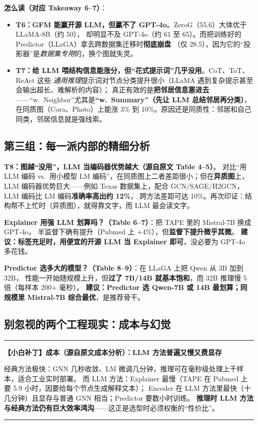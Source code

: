 \documentclass[11pt,UTF8,fontset=fandol]{ctexart}
\newenvironment{tip}[1]{%
  \par\smallskip\noindent\rule{\linewidth}{0.4pt}\par\nobreak
  \noindent\textbf{【小白补丁】#1}\par\nobreak\noindent\ignorespaces
}{%
  \par\noindent\rule{\linewidth}{0.4pt}\par\smallskip
}
\begin{document}
\textbf{怎么读（对应 Takeaway 6{--}7）}：
\begin{itemize}[leftmargin=2em]
  \item \textbf{T6：GFM 能赢开源 LLM，但赢不了 GPT-4o}。ZeroG（55.6）大体优于 LLaMA-8B（约 50），
        却明显不及 GPT-4o（约 61 至 65）。而把训练好的 Predictor（LLaGA）拿去跨数据集迁移时\textbf{彻底崩盘}
        （仅 28.5），因为它的“投影器”是\emph{数据集专用}的，换个图就失灵。
  \item \textbf{T7：给 LLM 喂结构信息能涨分，但“花式提示词”几乎没用}。CoT、ToT、ReAct 这些
        \emph{通用推理}提示词对节点分类提升很小（LLaMA 遇到复杂提示甚至会输出超长、难解析的内容）；
        真正有效的是\textbf{把邻居信息塞进去}——“w.\ Neighbor”尤其是\textbf{“w.\ Summary”（先让 LLM 总结邻居再分类）}，
        在同质图（Cora、Photo）上能涨 3\% 到 10\%。原因还是同质性：邻居和自己同类，邻居信息就是强线索。
\end{itemize}

\subsection{第三组：每一派内部的精细分析}

\textbf{T8：图越“没用”，LLM 当编码器优势越大（源自原文 Table 4{--}5）}。
对比“用 LLM 编码 vs.\ 用小模型 LM 编码”，在同质图上二者差距很小；但在\textbf{异质图}上，
LLM 编码器优势巨大——例如 Texas 数据集上，配合 GCN/SAGE/H2GCN，LLM 编码比 LM 编码\textbf{准确率高出约 12\%}，
跨方法差距可达 10\%。再次印证：结构帮不上忙时（异质图），就得靠文字，而 LLM 最会读文字。

\textbf{Explainer 用强 LLM 划算吗？（Table 6{--}7）}：把 TAPE 里的 Mistral-7B 换成 GPT-4o，
半监督下确有提升（Pubmed 上 +4\%），但\textbf{监督下提升微乎其微}。
\textbf{建议：标签充足时，用便宜的开源 LLM 当 Explainer 即可}，没必要为 GPT-4o 多花钱。

\textbf{Predictor 选多大的模型？（Table 8{--}9）}：在 LLaGA 上把 Qwen 从 3B 加到 32B，
性能一开始随规模上升，但\textbf{过了 7B/14B 就基本饱和}，而 32B 推理慢 5 倍（每样本 200+ 毫秒）。
\textbf{建议：Predictor 选 Qwen-7B 或 14B 最划算；同规模里 Mistral-7B 综合最优}，是推荐骨干。

\subsection{别忽视的两个工程现实：成本与幻觉}

\begin{tip}{成本（源自原文成本分析）：LLM 方法普遍又慢又费显存}
经典方法极快：GNN 几秒收敛、LM 微调几分钟，推理可在毫秒级处理上千样本，适合工业实时部署。
而 LLM 方法：Explainer 最慢（TAPE 在 Pubmed 上要 5.9 小时，因要给每个节点生成解释文本）；
Encoder 在 LLM 方法里最快（十几分钟）且显存与普通 GNN 相当；Predictor 要数小时训练。
\textbf{推理时 LLM 方法与经典方法仍有巨大效率鸿沟}——这正是选型时必须权衡的“性价比”。
\end{tip}
\end{document}
